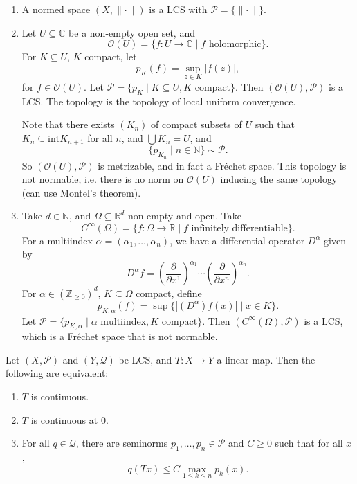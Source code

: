\documentclass[12pt]{article}
\begin{document}
\begin{exbox}
	\begin{enumerate}
		\item A normed space $(X, \|\cdot\|)$ is a LCS with $\mathcal{P} = \{\|\cdot\|\}$.
		\item Let $U \subseteq \mathbb{C}$ be a non-empty open set, and
			\[
				\mathcal{O}(U) = \{ f : U \to \mathbb{C} \mid f \text{ holomorphic}\}.
			\]
			For $K \subseteq U$, $K$ compact, let
			\[
			p_K(f) = \sup_{z \in K} |f(z)|,
			\]
			for $f \in \mathcal{O}(U)$. Let $\mathcal{P} = \{p_K \mid K \subseteq U, K \text{ compact}\}$. Then $(\mathcal{O}(U), \mathcal{P})$ is a LCS. The topology is the topology of local uniform convergence.

			Note that there exists $(K_n)$ of compact subsets of $U$ such that $K_n \subseteq \mathrm{int} K_{n+1}$ for all $n$, and $\bigcup K_n = U$, and
			\[
				\{ p_{K_n} \mid n \in \mathbb{N}\} \sim \mathcal{P}.
			\]
			So $(\mathcal{O}(U), \mathcal{P})$ is metrizable, and in fact a Fr\'echet space. This topology is not normable, i.e. there is no norm on $\mathcal{O}(U)$ inducing the same topology (can use Montel's theorem).
		\item Take $d \in \mathbb{N}$, and $\Omega \subseteq \mathbb{R}^d$ non-empty and open. Take
			\[
				C^\infty(\Omega) = \{f : \Omega \to \mathbb{R} \mid f \text{ infinitely differentiable}\}.
			\]
			For a multiindex $\alpha = (\alpha_1, \ldots, \alpha_n)$, we have a differential operator $D^\alpha$ given by
			\[
			D^\alpha f = \left( \frac{\partial}{\partial x^1} \right)^{\alpha_1} \cdots \left( \frac{\partial}{\partial x^n} \right)^{\alpha_n}.
			\]
			For $\alpha \in (\mathbb{Z}_{\geq 0})^d$, $K \subseteq \Omega$ compact, define
			\[
				p_{K, \alpha}(f) = \sup\{ |(D^\alpha)f(x)| \mid x \in K\}.
			\]
			Let $\mathcal{P} = \{p_{K, \alpha} \mid \alpha \text{ multiindex}, K \text{ compact}\}$. Then $(C^\infty(\Omega), \mathcal{P})$ is a LCS, which is a Fr\'echet space that is not normable.
	\end{enumerate}
	
\end{exbox}

\begin{lemma}
	Let $(X, \mathcal{P})$ and $(Y, \mathcal{Q})$ be LCS, and $T : X \to Y$ a linear map. Then the following are equivalent:
	\begin{enumerate}[\normalfont(i)]
		\item $T$ is continuous.
		\item $T$ is continuous at $0$.
		\item For all $q \in \mathcal{Q}$, there are seminorms $p_1, \ldots, p_n \in \mathcal{P}$ and $C \geq 0$ such that for all $x$,
			\[
			q(Tx) \leq C \max_{1 \leq k \leq n} p_k(x).
			\]
	\end{enumerate}
\end{lemma}
\end{document}
